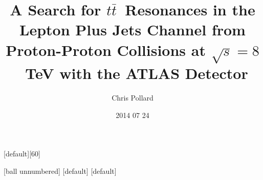  {
}


\newcommand{\met}{\ensuremath{E_{\rm T}^{miss}}}
\newcommand{\ttbar}{\ensuremath{t\bar t}}
\newcommand{\dr}{\ensuremath{\Delta R}}
\newcommand{\mtt}{\ensuremath{m_{\ttbar}}}
\newcommand{\wjets}{\ensuremath{W{\rm +jets}}}
\newcommand{\zjets}{\ensuremath{Z{\rm +jets}}}

\newcommand{\pythia}{{\sc Pythia}}
\newcommand{\herwig}{{\sc Herwig}}
\newcommand{\sherpa}{{\sc Sherpa}}
\newcommand{\alpgen}{{\sc Alpgen}}
\newcommand{\madgraph}{{\sc MadGraph}}
\newcommand{\acermc}{{\sc AcerMC}}
\newcommand{\powheg}{{\sc Powheg}}
\newcommand{\mcatnlo}{{\sc MC@NLO}}
\newcommand{\tauola}{{\sc Tauola}}
\newcommand{\photos}{{\sc Photos}}
\newcommand{\mstw}{MSTW2008}

\newcommand{\loosepp}{{\ttfamily loose++}}
\newcommand{\mediumpp}{{\ttfamily medium++}}
\newcommand{\tightpp}{{\ttfamily tight++}}

\newcommand{\sbr}{\ensuremath{\sigma \times {\rm BR}}}
\newcommand{\zp}{\ensuremath{Z^\prime}}
\newcommand{\kkg}{\ensuremath{g_{KK}}}


\newcommand{\smallr}{small-$R$}
\newcommand{\larger}{large-$R$}
\newcommand{\dsplit}{\ensuremath{\sqrt{d_{12}}}}
\newcommand{\mt}{\ensuremath{m_T}}

\newcommand{\bh}{{\ttfamily BumpHunter}}
\newcommand{\sqrts}{\ensuremath{\sqrt{s}}}
\newcommand{\ifb}{\ensuremath{{\rm fb}^{-1}}}
\newcommand{\geant}{{\sc Geant}}

\newcommand{\hlink}[2]{{\color{blue} \hyperlink{#1}{#2}}}
\newcommand{\backto}[2]{\hyperlink{#1}{\beamerbutton{back to #2}}}


\DeclareMathOperator{\sgn}{sgn}

\usepackage{graphicx}
\graphicspath{{./fig/}}

\usepackage{verbatim}
\usepackage{feynmf}

\usepackage{etoolbox}
\makeatletter
\patchcmd{\beamer@sectionintoc}{\vskip1.5em}{\vskip0.5em}{}{}
\makeatother

[default][60]



[ball unnumbered]
[default]
[default]

\title[\ttbar\ Resonances]
{A Search for \ttbar\ Resonances in the Lepton Plus Jets Channel
from Proton-Proton Collisions at $\sqrt{s} = 8$~TeV with the ATLAS
Detector}

\author{Chris Pollard}
\date{2014 07 24}
